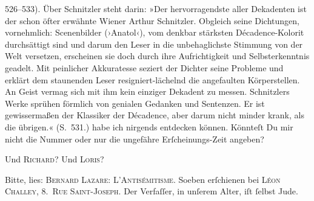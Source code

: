 {{{                     526–533). Über Schnitzler steht
                  darin: »Der hervorragendste aller Dekadenten ist der schon öfter erwähnte
                        Wiener Arthur Schnitzler. Obgleich seine Dichtungen, vornehmlich:
                     Scenenbilder (›Anatol‹), vom denkbar
                     stärksten Décadence-Kolorit durchsättigt sind und darum den Leser in die
                     unbehaglichste Stimmung von der Welt versetzen, erscheinen sie doch durch ihre
                     Aufrichtigkeit und Selbsterkenntnis geadelt. Mit peinlicher Akkuratesse seziert
                     der Dichter seine
                     Probleme und erklärt dem staunenden Leser resigniert-lächelnd die angefaulten
                     Körperstellen. An Geist vermag sich mit ihm kein einziger Dekadent zu messen.
                        Schnitzlers Werke sprühen förmlich von
                     genialen Gedanken und Sentenzen. Er ist gewissermaßen der Klassiker der
                     Décadence, aber darum nicht minder krank, als die übrigen.«
                     (S. 531.)}}}\label{K_L02621-12} habe ich nirgends entdecken können. Könnteſt Du
               mir nicht die Nummer oder nur die ungefähre Erſcheinungs-Zeit angeben?\pend
           
\pstart
           Und \textsc{Richard}? Und \textsc{Loris}?\pend
           
\pstart
           Bitte, lies: \textsc{Bernard Lazare}: \textsc{L’Antisémitisme}. Soeben erſchienen bei \textsc{Léon Challey}, \textsc{8. Rue Saint-Joseph}. Der Verfaſſer, in
               unſerem Alter, iſt{ }ſelbst Jude.\pend
           
